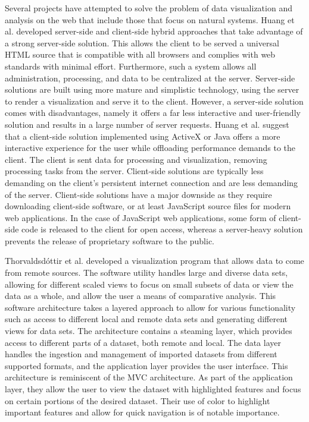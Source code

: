 %
%

Several projects have attempted to solve the problem of data visualization and analysis on the web that include those that focus on natural systems. Huang et al. \cite{gisvis} developed server-side and client-side hybrid approaches that take advantage of a strong server-side solution. This allows the client to be served a universal HTML source that is compatible with all browsers and complies with web standards with minimal effort.  Furthermore, such a system allows all administration, processing, and data to be centralized at the server. Server-side solutions are built using more mature and simplistic technology, using the server to render a visualization and serve it to the client. However, a server-side solution comes with disadvantages, namely it offers a far less interactive and user-friendly solution and results in a large number of server requests.  Huang et al. suggest that a client-side solution implemented using ActiveX or Java offers a more interactive experience for the user while offloading performance demands to the client.  The client is sent data for processing and visualization, removing processing tasks from the server. Client-side solutions are typically less demanding on the client’s persistent internet connection and are less demanding of the server.  Client-side solutions have a major downside as they require downloading client-side software, or at least JavaScript source files for modern web applications. In the case of JavaScript web applications, some form of client-side code is released to the client for open access, whereas a server-heavy solution prevents the release of proprietary software to the public. \par
Thorvaldsdóttir et al. \cite{igv} developed a visualization program that allows data to come from remote sources.  The software utility handles large and diverse data sets, allowing for different scaled views to focus on small subsets of data or view the data as a whole, and allow the user a means of comparative analysis.  This software architecture takes a layered approach to allow for various functionality such as access to different local and remote data sets and generating different views for data sets. The architecture contains a steaming layer, which provides access to different parts of a dataset, both remote and local.  The data layer handles the ingestion and management of imported datasets from different supported formats, and the application layer provides the user interface.  This architecture is reminiscent of the MVC architecture. As part of the application layer, they allow the user to view the dataset with highlighted features and focus on certain portions of the desired dataset.  Their use of color to highlight important features and allow for quick navigation is of notable importance. \par
